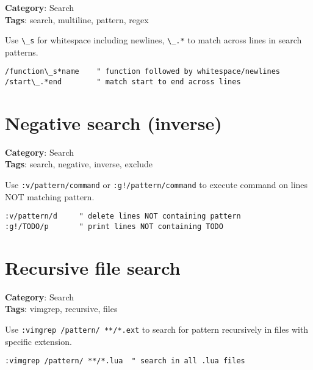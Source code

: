 {{{{{{{{{{{{{\textbf{Category}: Search\\ \textbf{Tags}: search, multiline, pattern, regex
\vspace{0.5cm}

Use {\footnotesize \Verb§\_s§} for whitespace including newlines, {\footnotesize \Verb§\_.*§} to match across lines in search patterns.

\begin{Exa*}{}
\begin{Verbatim}[fontsize=\footnotesize, breaklines, breakanywhere]
/function\_s*name    " function followed by whitespace/newlines
/start\_.*end        " match start to end across lines
\end{Verbatim}
\end{Exa*}

\section{Negative search (inverse)}

\textbf{Category}: Search\\ \textbf{Tags}: search, negative, inverse, exclude
\vspace{0.5cm}

Use {\footnotesize \Verb§:v/pattern/command§} or {\footnotesize \Verb§:g!/pattern/command§} to execute command on lines NOT matching pattern.

\begin{Exa*}{}
\begin{Verbatim}[fontsize=\footnotesize, breaklines, breakanywhere]
:v/pattern/d     " delete lines NOT containing pattern
:g!/TODO/p       " print lines NOT containing TODO
\end{Verbatim}
\end{Exa*}

\section{Recursive file search}

\textbf{Category}: Search\\ \textbf{Tags}: vimgrep, recursive, files
\vspace{0.5cm}

Use {\footnotesize \Verb§:vimgrep /pattern/ **/*.ext§} to search for pattern recursively in files with specific extension.

\begin{Exa*}{}
\begin{Verbatim}[fontsize=\footnotesize, breaklines, breakanywhere]
:vimgrep /pattern/ **/*.lua  " search in all .lua files
\end{Verbatim}
\end{Exa*}

}}}}}}}}}}}}}
